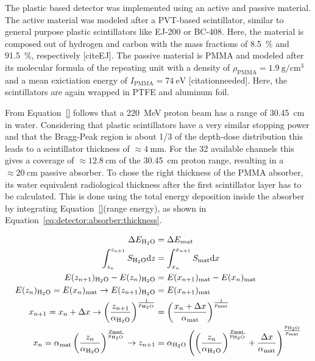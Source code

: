 The plastic based detector was implemented using an active and passive material.
The active material was modeled after a PVT-based scintillator, similar to general purpose plastic scintillators like EJ-200 or BC-408.
Here, the material is composed out of hydrogen and carbon with the mass fractions of \SI{8.5}{\percent} and \SI{91.5}{\percent}, respectively [citeEJ].
The passive material is PMMA and modeled after its molecular formula of the repeating unit  with a density of $\rho_{\text{PMMA}}=\SI{1.9}{\gram\per\cm\cubed}$ and a mean exictiation energy of $I_{\text{PMMA}} = \SI{74}{\electronvolt}$ [citationneeded]. 
Here, the scintillators are again wrapped in PTFE and aluminum foil.

From Equation~\ref{} follows that a \SI{220}{\mega\electronvolt} proton beam has a range of \SI{30.45}{\cm} in water.
Considering that plastic scintillators have a very similar stopping power and that the Bragg-Peak region is about 1/3 of the depth-dose distribution this leads to a scintillator thickness of $\approx\SI{4}{\mm}$.
For the 32 available channels this gives a coverage of $\approx \SI{12.8}{\centi\meter}$ of the \SI{30.45}{\centi\meter} proton range, resulting in a $\approx\SI{20}{\cm}$ passive absorber.
To chose the right thickness of the PMMA absorber, its water equivalent radiological thickness after the first scintillator layer has to be calculated.
This is done using the total energy deposition inside the absorber by integrating Equation~\ref{}(range energy), as shown in Equation~\ref{eq:detector:absorber:thickness}.

\begin{align}
    \label{eq:detector:absorber:thickness}
    \Delta E_{\ce{H2O}} &= \Delta E_{mat} \\
    \int_{z_n}^{z_{n+1}} S_{\ce{H2O}}\text{d}z &= \int_{x_n}^{x_{n+1}} S_\text{mat}\text{d}x \\
    E(z_{n+1})_{\ce{H2O}}-E(z_n)_{\ce{H2O}}&= E(x_{n+1})_{\text{mat}}-E(x_n)_{\text{mat}}\\
    E(z_n)_{\ce{H2O}} = E(x_n)_{\text{mat}} \rightarrow E(z_{n+1})_{\ce{H2O}} &= E(x_{n+1})_{\text{mat}} \\
    x_{n+1} = x_n + \Delta x \rightarrow \left(\frac{z_{n+1}}{\alpha_{\ce{H2O}}}\right)^{\frac{1}{p_{\ce{H2O}}}} &= \left(\frac{x_{n}+\Delta x}{\alpha_{\text{mat}}}\right)^{\frac{1}{p_{\text{mat}}}} \\
    x_{n} = \alpha_{\text{mat}} \left(\frac{z_n}{\alpha_{\ce{H2O}}}\right)^{\frac{p_{\text{mat}}}{p_{\ce{H2O}}}} \rightarrow z_{n+1} &= \alpha_{\ce{H2O}} \left(\left(\frac{z_n}{\alpha_{\ce{H2O}}}\right)^{\frac{p_{\text{mat}}}{p_{\ce{H2O}}}} + \frac{\Delta x}{\alpha_{\text{mat}}}\right)^{\frac{p_{\ce{H2O}}}{p_{\text{mat}}}}
\end{align}

